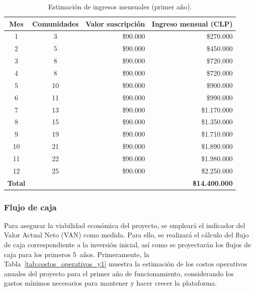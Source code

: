 {\begin{table}[H]
    \centering
    
    \caption{Estimación de ingresos mensuales (primer año).}
    
    \label{tab:ingresos_y1}
    
    \begin{tabular}{|c|c|r|r|}
    
    \hline
    \textbf{Mes} & \textbf{Comunidades} & \textbf{Valor suscripción} & \textbf{Ingreso mensual (CLP)}\\
    \hline
    
    1 & 3 & \$90.000 & \$270.000\\
    2 & 5 & \$90.000 & \$450.000\\
    3 & 8 & \$90.000 & \$720.000\\
    4 & 8 & \$90.000 & \$720.000\\
    5 & 10 & \$90.000 & \$900.000\\
    6 & 11 & \$90.000 & \$990.000\\
    7 & 13 & \$90.000 & \$1.170.000\\
    8 & 15 & \$90.000 & \$1.350.000\\
    9 & 19 & \$90.000 & \$1.710.000\\
    10 & 21 & \$90.000 & \$1.890.000\\
    11 & 22 & \$90.000 & \$1.980.000\\
    12 & 25 & \$90.000 & \$2.250.000\\
    \hline %
    \textbf{Total} & & & \textbf{\$14.400.000}\\
    \hline
    
    \end{tabular}
\end{table}



\subsubsection{Flujo de caja}

Para asegurar la viabilidad económica del proyecto, se empleará el indicador del Valor Actual Neto (VAN) como medida.  Para ello, se realizará el cálculo del flujo de caja correspondiente a la inversión inicial, así como se proyectarán los flujos de caja para los primeros 5~años. 
Primeramente, la Tabla~\ref{tab:costos_operativos_y1} muestra la estimación de los costos operativos anuales del proyecto para el primer año de funcionamiento, considerando los gastos mínimos necesarios para mantener y hacer crecer la plataforma.

}
